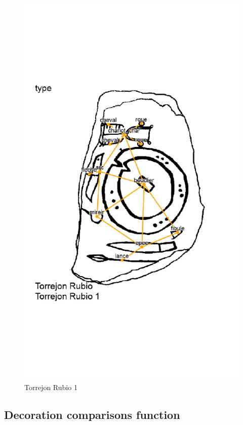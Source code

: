 \documentclass[article]{jss}\usepackage{knitr}
\begin{document}
\begin{knitrout}
\begin{figure}[H]
{\centering \includegraphics[width=\maxwidth]{figure/unnamed-chunk-11-1} 

}

\caption{\label{fig:figs}Torrejon Rubio 1}\label{fig:unnamed-chunk-11}
\end{figure}


\end{knitrout}

\subsection{Decoration comparisons function} \label{sec:functions_one}
\end{document}
